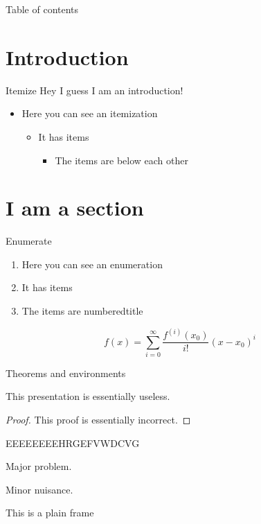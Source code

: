 \documentclass{beamer}
\begin{document}
\begin{frame}{Table of contents}
	\tableofcontents
\end{frame}

\section{Introduction}
\begin{frame}{Itemize}
Hey I guess I am an introduction!

\begin{itemize}
\item Here you can see an itemization
\begin{itemize}
\item It has items
\begin{itemize}
\item The items are below each other
\end{itemize}
\end{itemize}
\end{itemize}
\end{frame}

\section{I am a section}
\sepframe{\insertsection}


\begin{frame}{Enumerate}
\begin{enumerate}
\item Here you can see an enumeration
\item It has items
\item The items are numberedtitle
\end{enumerate}
\[
	f(x)=\sum_{i=0}^\infty \frac{f^{(i)}(x_0)}{i!}(x-x_0)^i
\]
\end{frame}

\begin{frame}[plain]{Theorems and environments}
\begin{theorem}
This presentation is essentially useless.
\end{theorem}
\begin{proof}
This proof is essentially incorrect.
\end{proof}
\end{frame}

\begin{frame}{EEEEEEEEHRGEFVWDCVG}
\begin{example}
Major problem.
\end{example}
\begin{solution}
Minor nuisance.
\end{solution}
\end{frame}

\begin{frame}[plain]{This is a plain frame}
\lipsum[2]
\end{frame}
\end{document}
